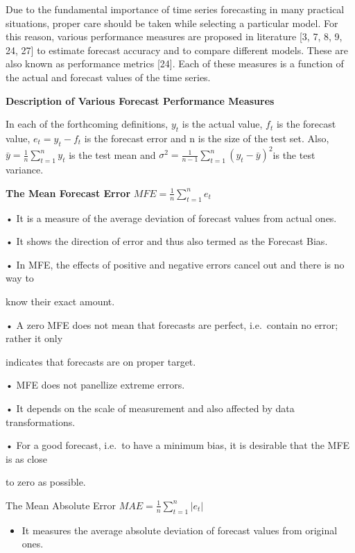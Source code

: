 \documentclass[12pt,a4paper]{book}
\begin{document}
{Due to the fundamental importance of time series forecasting in many
practical situations, proper care should be taken while selecting a
particular model. For this reason, various performance measures are
proposed in literature {[}3, 7, 8, 9, 24, 27{]} to estimate forecast
accuracy and to compare different models. These are also known as
performance metrics {[}24{]}. Each of these measures is a function of
the actual and forecast values of the time series.

\textbf{Description of Various Forecast Performance Measures}

In each of the forthcoming definitions, \(y_{t }\) is the actual value,
\(f_{t}\) is the forecast value, \(e_{t} = y_{t} - f_{t}\) is the
forecast error and n is the size of the test set. Also,
\(\displaystyle \bar{y} = \frac{1}{n}\sum_{t=1}^{n}y_{t}\) is the test
mean and
\(\displaystyle \sigma^{2} = \frac{1}{n-1}\sum_{t=1}^{n}(y_{t}-\bar{y})^{2}\)is
the test variance.

\textbf{The Mean Forecast Error}
\(\displaystyle MFE = \frac{1}{n}\sum_{t=1}^{n}e_{t}\)

• It is a measure of the average deviation of forecast values from
actual ones.

• It shows the direction of error and thus also termed as the Forecast
Bias.

• In MFE, the effects of positive and negative errors cancel out and
there is no way to

know their exact amount.

• A zero MFE does not mean that forecasts are perfect, i.e.~contain no
error; rather it only

indicates that forecasts are on proper target.

• MFE does not panellize extreme errors.

• It depends on the scale of measurement and also affected by data
transformations.

• For a good forecast, i.e.~to have a minimum bias, it is desirable that
the MFE is as close

to zero as possible.

The Mean Absolute Error
\(\displaystyle MAE = \frac{1}{n}\sum_{t=1}^{n}|e_{t}|\)

\begin{itemize}
\tightlist
\item
  It measures the average absolute deviation of forecast values from
  original ones.
\end{itemize}

}
\end{document}

